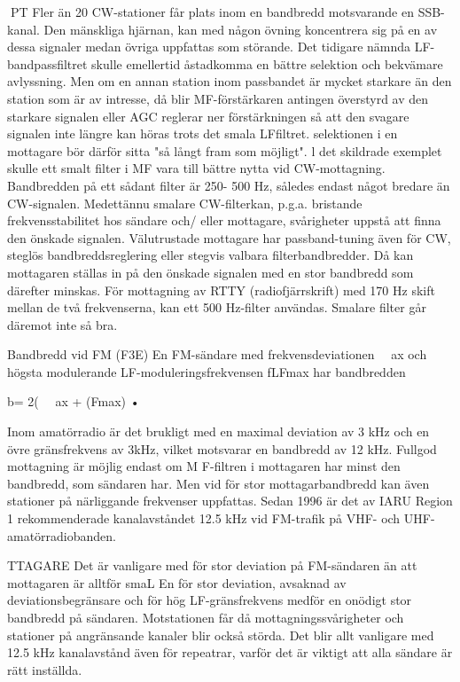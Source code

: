 PT
Fler än 20 CW-stationer får plats inom en
bandbredd motsvarande en SSB-kanal. Den
mänskliga hjärnan, kan med någon övning
koncentrera sig på en av dessa signaler
medan övriga uppfattas som störande.
Det tidigare nämnda LF-bandpassfiltret
skulle emellertid åstadkomma en bättre selektion och bekvämare avlyssning. Men om
en annan station inom passbandet är mycket
starkare än den station som är av intresse,
då blir MF-förstärkaren antingen överstyrd
av den starkare signalen eller AGC reglerar
ner förstärkningen så att den svagare signalen inte längre kan höras trots det smala LFfiltret. selektionen i en mottagare bör därför
sitta "så långt fram som möjligt". l det skildrade exemplet skulle ett smalt filter i MF vara
till bättre nytta vid CW-mottagning. Bandbredden på ett sådant filter är 250- 500 Hz,
således endast något bredare än CW-signalen.
Medettännu smalare CW-filterkan, p.g.a.
bristande frekvensstabilitet hos sändare och/
eller mottagare, svårigheter uppstå att finna
den önskade signalen. Välutrustade mottagare har passband-tuning även för CW,
steglös bandbreddsreglering eller stegvis
valbara filterbandbredder. Då kan mottagaren ställas in på den önskade signalen med
en stor bandbredd som därefter minskas.
För mottagning av RTTY (radiofjärrskrift)
med 170 Hz skift mellan de två frekvenserna, kan ett 500 Hz-filter användas. Smalare filter går däremot inte så bra.

Bandbredd vid FM (F3E)
En FM-sändare med frekvensdeviationen
~~ax och högsta modulerande LF-moduleringsfrekvensen fLFmax har bandbredden

b= 2( ~~ax + (Fmax) •

Inom amatörradio är det brukligt med en
maximal deviation av 3 kHz och en övre
gränsfrekvens av 3kHz, vilket motsvarar en
bandbredd av 12 kHz.
Fullgod mottagning är möjlig endast om
M F-filtren i mottagaren har minst den bandbredd, som sändaren har. Men vid för stor
mottagarbandbredd kan även stationer på
närliggande frekvenser uppfattas. Sedan
1996 är det av IARU Region 1 rekommenderade kanalavståndet 12.5 kHz vid FM-trafik
på VHF- och UHF-amatörradiobanden.

TTAGARE
Det är vanligare med för stor deviation på
FM-sändaren än att mottagaren är alltför
smaL En för stor deviation, avsaknad av
deviationsbegränsare och för hög LF-gränsfrekvens medför en onödigt stor bandbredd
på sändaren. Motstationen får då mottagningssvårigheter och stationer på angränsande kanaler blir också störda.
Det blir allt vanligare med 12.5 kHz kanalavstånd även för repeatrar, varför det är
viktigt att alla sändare är rätt inställda.

